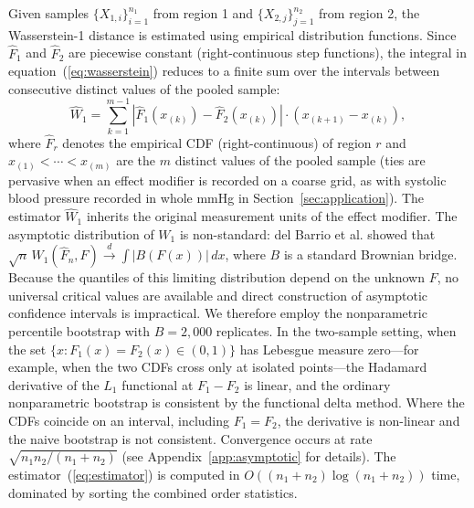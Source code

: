 \documentclass[AMA,Times1COL]{WileyNJDv5}
\begin{document}
Given samples $\{X_{1,i}\}_{i=1}^{n_1}$ from region 1 and $\{X_{2,j}\}_{j=1}^{n_2}$ from region 2, the Wasserstein-1 distance is estimated using empirical distribution functions. Since $\hat{F}_1$ and $\hat{F}_2$ are piecewise constant (right-continuous step functions), the integral in equation~(\ref{eq:wasserstein}) reduces to a finite sum over the intervals between consecutive distinct values of the pooled sample:
\begin{equation}
\widehat{W}_1 = \sum_{k=1}^{m-1} |\hat{F}_1(x_{(k)}) - \hat{F}_2(x_{(k)})| \cdot (x_{(k+1)} - x_{(k)}),
\label{eq:estimator}
\end{equation}
where $\hat{F}_r$ denotes the empirical CDF (right-continuous) of region $r$ and $x_{(1)} < \cdots < x_{(m)}$ are the $m$ distinct values of the pooled sample (ties are pervasive when an effect modifier is recorded on a coarse grid, as with systolic blood pressure recorded in whole mmHg in Section~\ref{sec:application}). The estimator $\widehat{W}_1$ inherits the original measurement units of the effect modifier. The asymptotic distribution of $W_1$ is non-standard: del Barrio et al.\cite{delbarrio1999} showed that $\sqrt{n}\,W_1(\hat{F}_n, F) \xrightarrow{d} \int |B(F(x))|\,dx$, where $B$ is a standard Brownian bridge. Because the quantiles of this limiting distribution depend on the unknown $F$, no universal critical values are available and direct construction of asymptotic confidence intervals is impractical. We therefore employ the nonparametric percentile bootstrap with $B = 2{,}000$ replicates.\cite{efron1993} In the two-sample setting, when the set $\{x : F_1(x) = F_2(x) \in (0,1)\}$ has Lebesgue measure zero---for example, when the two CDFs cross only at isolated points---the Hadamard derivative of the $L_1$ functional at $F_1 - F_2$ is linear, and the ordinary nonparametric bootstrap is consistent by the functional delta method. Where the CDFs coincide on an interval, including $F_1 = F_2$, the derivative is non-linear and the naive bootstrap is not consistent.\cite{sommerfeld2018} Convergence occurs at rate $\sqrt{n_1 n_2/(n_1+n_2)}$ (see Appendix~\ref{app:asymptotic} for details). The estimator~(\ref{eq:estimator}) is computed in $O((n_1 + n_2) \log(n_1 + n_2))$ time, dominated by sorting the combined order statistics.
\end{document}
